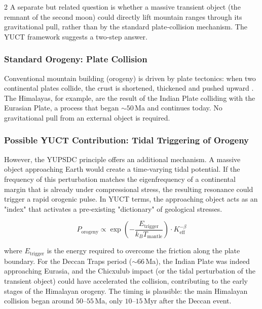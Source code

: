 \documentclass[11pt,a4paper]{article}
\begin{document}
\begin{multicols}{2}
		A separate but related question is whether a massive transient object
		(the remnant of the second moon) could directly lift mountain ranges
		through its gravitational pull, rather than by the standard plate‑collision
		mechanism. The YUCT framework suggests a two‑step answer.
		
		\subsubsection{Standard Orogeny: Plate Collision}
		
		Conventional mountain building (orogeny) is driven by plate tectonics:
		when two continental plates collide, the crust is shortened, thickened
		and pushed upward \cite{Kearey2013}. The Himalayas, for example, are the
		result of the Indian Plate colliding with the Eurasian Plate, a process
		that began \(\sim 50\) Ma and continues today. No gravitational pull from
		an external object is required.
		
		\subsubsection{Possible YUCT Contribution: Tidal Triggering of Orogeny}
		
		However, the YUPSDC principle offers an additional mechanism. A massive
		object approaching Earth would create a time‑varying tidal potential.
		If the frequency of this perturbation matches the eigenfrequency of a
		continental margin that is already under compressional stress, the
		resulting resonance could trigger a rapid orogenic pulse. In YUCT terms,
		the approaching object acts as an "index" that activates a pre‑existing
		"dictionary" of geological stresses.
		
		\begin{equation}
			P_{\text{orogeny}} \propto \exp\left(-\frac{E_{\text{trigger}}}{k_B T_{\text{mantle}}}\right) \cdot K_{\mathrm{eff}}^{-\beta}
		\end{equation}
		
		where \(E_{\text{trigger}}\) is the energy required to overcome the
		friction along the plate boundary. For the Deccan Traps period
		(\(\sim 66\) Ma), the Indian Plate was indeed approaching Eurasia,
		and the Chicxulub impact (or the tidal perturbation of the transient
		object) could have accelerated the collision, contributing to the early
		stages of the Himalayan orogeny. The timing is plausible: the main
		Himalayan collision began around \(50\)–\(55\) Ma, only \(10\)–\(15\) Myr
		after the Deccan event.
		

\end{multicols}
\end{document}
